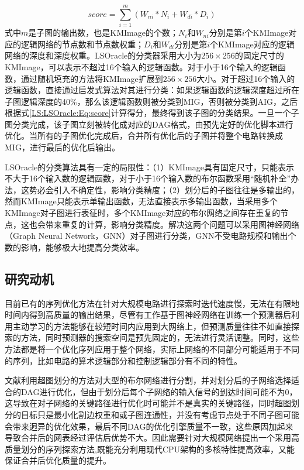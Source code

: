 \begin{equation}
\label{LS:LSOracle:Eq:score}
score = \sum_{i=1}^{m} ( W_{ni} * N_i +W_{di} *D_i )
\end{equation}
式中$m$是子图的输出数，也是KMImage的个数；$N_i$和$W_{ni}$分别是第$i$个KMImage对应的逻辑网络的节点数和节点数权重；$D_i$和$W_{di}$分别是第$i$个KMImage对应的逻辑网络的深度和深度权重。LSOracle的分类器采用大小为$256 \times 256$的固定尺寸的KMImage，可以表示不超过16个输入的逻辑函数。对于小于16个输入的逻辑函数，通过随机填充的方法将KMImage扩展到$256 \times 256$大小。对于超过16个输入的逻辑函数，直接通过启发式算法对其进行分类：如果逻辑函数的逻辑深度超过所在子图逻辑深度的40\%，那么该逻辑函数则被分类到MIG，否则被分类到AIG，之后根据式\eqref{LS:LSOracle:Eq:score}计算得分，最终得到该子图的分类结果。一旦一个子图分类完成，该子图立刻被转化成对应的DAG格式，由预先定好的优化脚本进行优化。当所有的子图优化完成后，合并所有优化后的子图并将整个电路转换成MIG，进行最后的优化后输出。

LSOracle的分类算法具有一定的局限性：（1）KMImage具有固定尺寸，只能表示不大于16个输入数的逻辑函数，对于小于16个输入数的布尔函数采用“随机补全”办法，这势必会引入不确定性，影响分类精度；（2）划分后的子图往往是多输出的，然而KMImage只能表示单输出函数，无法直接表示多输出函数，当采用多个KMImage对子图进行表征时，多个KMImage对应的布尔网络之间存在重复的节点，这也会带来重复的计算，影响分类精度。解决这两个问题可以采用图神经网络（Graph Neural Network，GNN）对子图进行分类，GNN不受电路规模和输出个数的影响，能够极大地提高分类效率。

\subsection{研究动机}

目前已有的序列优化方法\cite{LS:BOiLS,LS:DRiLLS}在针对大规模电路进行探索时迭代速度慢，无法在有限地时间内得到高质量的输出结果，尽管有工作\cite{LS:Bulls-Eye}基于图神经网络在训练一个预测器后利用主动学习的方法能够在较短时间内应用到大网络上，但预测质量往往不如直接探索的方法，同时预测器的搜索空间是预先固定的，无法进行灵活调整。同时，这些方法都是将一个优化序列应用于整个网络，实际上网络的不同部分可能适用于不同的序列，比如电路的算术逻辑部分和控制逻辑部分有不同的特性\cite{LS:MIG}。

文献\cite{LS:LSOracle}利用超图划分的方法对大型的布尔网络进行分割，并对划分后的子网络选择适合的DAG进行优化，但由于划分后每个子网络的输入信号的到达时间可能不为0，这导致在对子网络的关键路径进行优化时可能并不是真实的关键路径，同时超图划分的目标只是最小化割边权重和或子图连通性，并没有考虑节点处于不同子图可能会带来迥异的优化效果，最后不同DAG的优化引擎质量不一致，这些原因加起来导致合并后的网表经过评估后优势不大。因此需要针对大规模网络提出一个采用高质量划分的序列探索方法,既能充分利用现代CPU架构的多核特性提高效率，又能保证合并后优化质量的提升。


